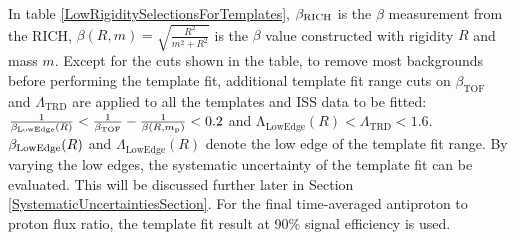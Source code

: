 In table \ref{LowRigiditySelectionsForTemplates}, $\beta_{\rm{RICH}}$ is the $\beta$ measurement from the RICH, $\beta(R,m)=\sqrt{\frac{R^2}{m^2+R^2}}$ is the $\beta$ value constructed with rigidity $R$ and mass $m$. Except for the cuts shown in the table, to remove most backgrounds before performing the template fit, additional template fit range cuts on $\beta_\mathrm{TOF}$ and $\Lambda_{\mathrm{TRD}}$ are applied to all the templates and ISS data to be fitted: $\frac{1}{\beta_\mathrm{LowEdge}(R)} < \frac{1}{\beta_\mathrm{TOF}}-\frac{1}{\beta(R,m_{{\rm{p}}})}<0.2$ and $ \mathrm{\Lambda}_\mathrm{LowEdge}(R) < \Lambda_{\mathrm{TRD}} <  1.6 $. $\beta_{\rm{LowEdge}}(R)$ and $\Lambda_{\mathrm{LowEdge}}(R)$ denote the low edge of the template fit range. By varying the low edges, the systematic uncertainty of the template fit can be evaluated. This will be discussed further later in Section \ref{SystematicUncertaintiesSection}. For the final time-averaged antiproton to proton flux ratio, the template fit result at 90\% signal efficiency is used. \par





